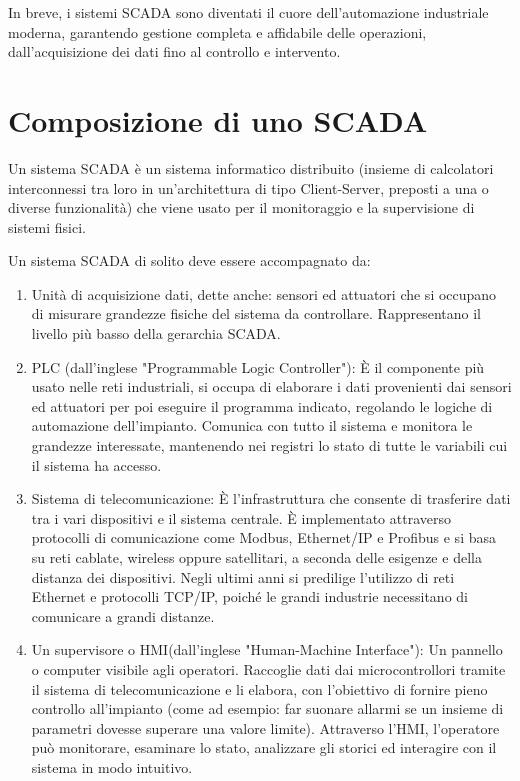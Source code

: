 In breve, i sistemi SCADA sono diventati il cuore dell'automazione industriale moderna, garantendo gestione completa e affidabile delle operazioni, dall'acquisizione dei dati fino al controllo e intervento.

\section{Composizione di uno SCADA}
Un sistema SCADA è un sistema informatico distribuito (insieme di calcolatori interconnessi tra loro in un'architettura di tipo Client-Server, preposti a una o diverse funzionalità) che viene usato per il monitoraggio e la supervisione di sistemi fisici.

Un sistema SCADA di solito deve essere accompagnato da:
\begin{enumerate}
    \item Unità di acquisizione dati, dette anche: sensori ed attuatori che si occupano di misurare grandezze fisiche del sistema da controllare. Rappresentano il livello più basso della gerarchia SCADA.
    \item PLC (dall'inglese "Programmable Logic Controller"): È il componente più usato nelle reti industriali, si occupa di elaborare i dati provenienti dai sensori ed attuatori per poi eseguire il programma indicato, regolando le logiche di automazione dell'impianto. Comunica con tutto il sistema e monitora le grandezze interessate, mantenendo nei registri lo stato di tutte le variabili cui il sistema ha accesso.
    \item Sistema di telecomunicazione: È l'infrastruttura che consente di trasferire dati tra i vari dispositivi e il sistema centrale. È implementato attraverso protocolli di comunicazione come Modbus, Ethernet/IP e Profibus e si basa su reti cablate, wireless oppure satellitari, a seconda delle esigenze e della distanza dei dispositivi. Negli ultimi anni si predilige l'utilizzo di reti Ethernet e protocolli TCP/IP, poiché le grandi industrie necessitano di comunicare a grandi distanze.
    \item Un supervisore o HMI(dall'inglese "Human-Machine Interface"): Un pannello o computer visibile agli operatori. Raccoglie dati dai microcontrollori tramite il sistema di telecomunicazione e li elabora, con l'obiettivo di fornire pieno controllo all'impianto (come ad esempio: far suonare allarmi se un insieme di parametri dovesse superare una valore limite). Attraverso l'HMI, l'operatore può monitorare, esaminare lo stato, analizzare gli storici ed interagire con il sistema in modo intuitivo.
\end{enumerate}
